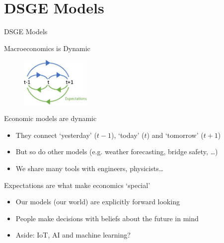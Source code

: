 \section{DSGE Models}

\begin{frame}

\begin{center}
{\LARGE DSGE Models}
\end{center}

\end{frame}


\begin{frame}{Macroeconomics is Dynamic}

\begin{figure}
\centering
\label{fig:expectations}
\includegraphics[width=0.3\textwidth]{Figures/ge_timing_expectations.JPG}
\end{figure}

Economic models are dynamic
\begin{itemize}
\item	They connect `yesterday' ($t-1$), `today' ($t$) and `tomorrow' ($t+1$)
\item	But so do other models (e.g. weather forecasting, bridge safety, \ldots)
\item	We share many tools with engineers, physicists\ldots	
\end{itemize}

Expectations are what make economics `special'
\begin{itemize}
\item	Our models (our world) are explicitly forward looking
\item	People make decisions with beliefs about the future in mind
\item	Aside: IoT, AI and machine learning?
\end{itemize}

\end{frame}

